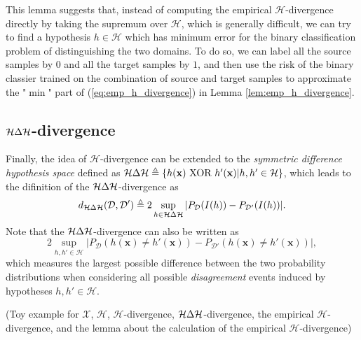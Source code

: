 This lemma suggests that, instead of computing the empirical $\mathcal{H}$-divergence directly by taking the supremum over $\mathcal{H}$, which is generally difficult, we can try to find a hypothesis $h \in \mathcal{H}$ which has minimum error for the binary classification problem of distinguishing the two domains. To do so, we can label all the source samples by $0$ and all the target samples by $1$, and then use the risk of the binary classier trained on the combination of source and target samples to approximate the "$\min$" part of (\ref{eq:emp_h_divergence}) in Lemma \ref{lem:emp_h_divergence}.

\subsection{$\mathcal{H} \Delta \mathcal{H}$-divergence}
Finally, the idea of $\mathcal{H}$-divergence can be extended to the \textit{symmetric difference hypothesis space} defined as $\mathcal{H} \Delta \mathcal{H} \triangleq \{ h(\mathbf{x}) \text{ XOR } h'(\mathbf{x}) \vert h, h' \in \mathcal{H} \}$, which leads to the difinition of the $\mathcal{H} \Delta \mathcal{H}$-divergence as
\begin{equation}\label{eq:hdh_divergence}
  d_{\mathcal{H} \Delta \mathcal{H}}(\mathcal{D}, \mathcal{D}') \triangleq 2\sup_{h \in \mathcal{H} \Delta \mathcal{H}} \vert P_{\mathcal{D}}(I(h))-P_{\mathcal{D}'}(I(h)) \vert.
\end{equation}
Note that the $\mathcal{H} \Delta \mathcal{H}$-divergence can also be written as
\begin{equation}\label{eq:hdh_divergence2}
  2\sup_{h, h' \in \mathcal{H}} \vert P_{\mathcal{D}}(h(\mathbf{x}) \neq h'(\mathbf{x}))-P_{\mathcal{D}'}(h(\mathbf{x}) \neq h'(\mathbf{x})) \vert,
\end{equation}
which measures the largest possible difference between the two probability distributions when considering all possible \textit{disagreement} events induced by hypotheses $h,h' \in \mathcal{H}$.


(Toy example for $\mathcal{X}$, $\mathcal{H}$, $\mathcal{H}$-divergence, $\mathcal{H} \Delta \mathcal{H}$-divergence, the empirical $\mathcal{H}$-divergence, and the lemma about the calculation of the empirical $\mathcal{H}$-divergence)